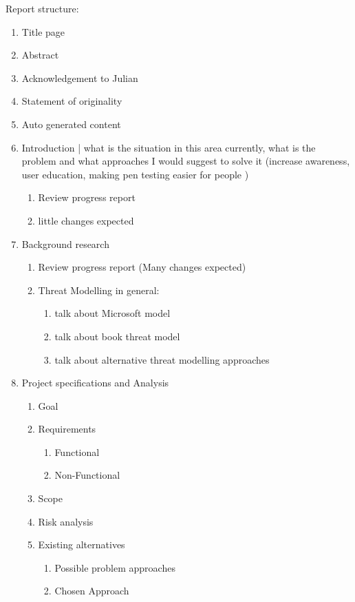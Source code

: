 Report structure:
\begin{enumerate}
	\item Title page
	
	\item Abstract
	
	\item Acknowledgement to Julian
	
	\item Statement of originality
	
	\item Auto generated content
	
	\item Introduction | what is the situation in this area currently, what is the problem and what approaches I would suggest to solve it (increase awareness, user education, making pen testing easier for people )
	\begin{enumerate}
	  	\item Review progress report
	  	\item little changes expected
	\end{enumerate}
	
	\item Background research
	\begin{enumerate}
		\item Review progress report (Many changes expected)
		\item Threat Modelling in general:
		\begin{enumerate}
			\item talk about Microsoft model
			\item talk about book threat model
			\item talk about alternative threat modelling approaches
		\end{enumerate}
	\end{enumerate}
	
	\item Project specifications and Analysis
	\begin{enumerate}
		\item Goal
		\item Requirements
		\begin{enumerate}
			\item Functional
			\item Non-Functional
		\end{enumerate}
		\item Scope
		\item Risk analysis
		\item Existing alternatives
		\begin{enumerate}
			\item Possible problem approaches
			\item Chosen Approach
		\end{enumerate}
	\end{enumerate}


\end{enumerate}
